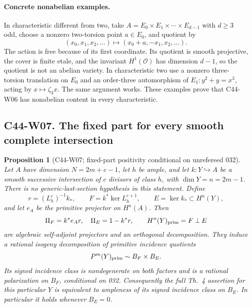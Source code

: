 \documentclass[11pt]{article}
\newtheorem{proposition}[theorem]{Proposition}
\theoremstyle{remark}\newtheorem{remark}[theorem]{Remark}
\begin{document}
\paragraph{Concrete nonabelian examples.}
In characteristic different from two, take
$A=E_0\times E_1\times\cdots\times E_{d-1}$ with $d\geq3$ odd,
choose a nonzero two-torsion point $a\in E_0$, and quotient by
\[
 (x_0,x_1,x_2,\ldots)\longmapsto(x_0+a,-x_1,x_2,\ldots).
\]
The action is free because of its first coordinate. Its quotient
is smooth projective, the cover is finite etale, and the invariant
$H^1(\mathcal O)$ has dimension $d-1$, so the quotient is not an
abelian variety. In characteristic two use a nonzero three-torsion
translation on $E_0$ and an order-three automorphism of
$E_1:y^2+y=x^3$, acting by $x\mapsto\zeta_3x$. The same argument
works. These examples prove that C44-W06 has nonabelian content in
every characteristic.

\subsection*{C44-W07. The fixed part for every smooth complete intersection}

\begin{proposition}[C44-W07; fixed-part positivity conditional on unrefereed 032]
Let $A$ have dimension $N=2m+c-1$, let $h$ be ample, and let
$k:Y\hookrightarrow A$ be a smooth successive intersection of
$c$ divisors of class $h$, with $\dim Y=n=2m-1$. There is no
generic-last-section hypothesis in this statement. Define
\[
 r=(L_h^c)^{-1}k_*,\qquad
 F=k^*\ker L_h^{c+1},\qquad E=\ker k_*\subset H^n(Y),
\]
and let $e_A$ be the primitive projector on $H^n(A)$. Then
\[
 \Pi_F=k^*e_A r,\quad \Pi_E=1-k^*r,\qquad
 H^n(Y)_{\rm prim}=F\mathbin\perp E
\]
are algebraic self-adjoint projectors and an orthogonal decomposition.
They induce a rational isogeny decomposition of primitive incidence
quotients
\[
 P^m(Y)_{\rm prim}\sim B_F\times B_E.
\]
Its signed incidence class is nondegenerate on both factors and is
a rational polarization on $B_F$, conditional on 032. Consequently
the full Th.~4 assertion for this particular $Y$ is equivalent to
ampleness of its signed incidence class on $B_E$. In particular it
holds whenever $B_E=0$.
\end{proposition}
\end{document}
